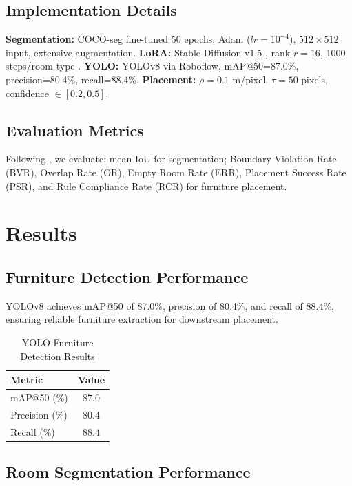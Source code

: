 \documentclass[10pt,conference]{IEEEtran}
\begin{document}
\subsection{Implementation Details}

\textbf{Segmentation:} COCO-seg fine-tuned 50 epochs, Adam ($lr=10^{-4}$), $512{\times}512$ input, extensive augmentation.
\textbf{LoRA:} Stable Diffusion v1.5 \cite{b3}, rank $r{=}16$, 1000 steps/room type \cite{b4, b5}.
\textbf{YOLO:} YOLOv8 via Roboflow, mAP@50=87.0\%, precision=80.4\%, recall=88.4\%.
\textbf{Placement:} $\rho{=}0.1$ m/pixel, $\tau{=}50$ pixels, confidence $\in[0.2, 0.5]$.

\subsection{Evaluation Metrics}

Following \cite{b15}, we evaluate: mean IoU for segmentation; Boundary Violation Rate (BVR), Overlap Rate (OR), Empty Room Rate (ERR), Placement Success Rate (PSR), and Rule Compliance Rate (RCR) for furniture placement.

\section{Results}

\subsection{Furniture Detection Performance}

YOLOv8 achieves mAP@50 of 87.0\%, precision of 80.4\%, and recall of 88.4\%, ensuring reliable furniture extraction for downstream placement.
\begin{table}[htbp]
\caption{YOLO Furniture Detection Results}
\begin{center}
\begin{tabular}{|l|c|}
\hline
\textbf{Metric} & \textbf{Value} \\
\hline
mAP@50 (\%) & 87.0 \\
Precision (\%) & 80.4 \\
Recall (\%) & 88.4 \\
\hline
\end{tabular}
\label{tab:yolo}
\end{center}
\end{table}
\subsection{Room Segmentation Performance}
\end{document}

